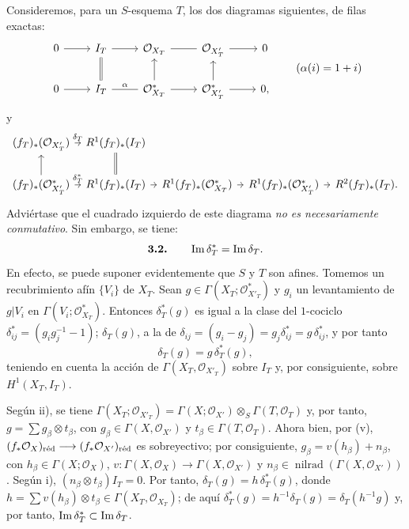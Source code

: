 Consideremos, para un $S$-esquema $T$, los dos diagramas siguientes, de
filas exactas:
\[
\begin{tikzcd}
0 \arrow[r] & I_T \arrow[r] & \mathcal O_{X_T} \arrow[r,dash] &
\mathcal O_{X'_T} \arrow[r] & 0\\
0 \arrow[r] & I_T \arrow[r,"\alpha",dash] \arrow[u,equal] &
\mathcal O_{X_T}^{*} \arrow[r] \arrow[u] &
\mathcal O_{X'_T}^{*} \arrow[r] \arrow[u] & 0 ,
\end{tikzcd}
\qquad (\alpha(i)=1+i)
\]
y
\[
\begin{tikzcd}[column sep=tiny]
(f_T)_*(\mathcal O_{X'_T}) \arrow[r,"\delta_T"] &
R^1(f_T)_*(I_T) \arrow[d,equal]\\
(f_T)_*(\mathcal O_{X'_T}^{*}) \arrow[r,"\delta_T^*"] \arrow[u] &
R^1(f_T)_*(I_T) \arrow[r] &
R^1(f_T)_*(\mathcal O_{X_T}^{*}) \arrow[r] &
\sisi{R'(f_T)_*}{R^1(f_T)_*}(\mathcal O_{X'_T}^{*}) \arrow[r] &
R^2(f_T)_*(I_T) .
\end{tikzcd}
\]
Adviértase que el cuadrado izquierdo de este diagrama \emph{no es
necesariamente conmutativo}. Sin embargo, se tiene:
\[
\textbf{3.2.}\qquad \im\delta_T^*=\im\delta_T.
\]
En efecto, se puede suponer evidentemente que $S$ y $T$ son afines. Tomemos
un recubrimiento afín $\{V_i\}$ de $X_T$. Sean
$g\in\Gamma(X_T;\mathcal O_{X'_T}^{*})$ y $g_i$ un levantamiento de
$g|V_i$ en $\Gamma(V_i;\mathcal O_{X_T}^{*})$. Entonces
$\delta_T^*(g)$ es igual a la clase del $1$-cociclo
$\delta_{ij}^*=(g_ig_j^{-1}-1)$; $\delta_T(g)$, a la de
$\delta_{ij}=(g_i-g_j)=g_j\delta_{ij}^*=g\,\delta_{ij}^*$, y por tanto
\[
\delta_T(g)=g\,\delta_T^*(g),
\]
teniendo en cuenta la acción de
$\Gamma(X_T,\mathcal O_{X'_T})$ sobre $I_T$ y, por consiguiente, sobre
$H^1(X_T,I_T)$.

Según ii), se tiene
$\Gamma(X_T;\mathcal O_{X'_T})=
\Gamma(X;\mathcal O_{X'})\otimes_S\Gamma(T,\mathcal O_T)$ y, por tanto,
$g=\sum g_\beta\otimes t_\beta$, con
$g_\beta\in\Gamma(X,\mathcal O_{X'})$ y
$t_\beta\in\Gamma(T,\mathcal O_T)$. Ahora bien, por (v),
$(f_*\mathcal O_X)_{\red}\longrightarrow
(f_*\mathcal O_{X'})_{\red}$ es sobreyectivo; por consiguiente,
$g_\beta=v(h_\beta)+n_\beta$, con
$h_\beta\in\Gamma(X;\mathcal O_X)$,
$v:\Gamma(X,\mathcal O_X)\to\Gamma(X,\mathcal O_{X'})$ y
$n_\beta\in\operatorname{nilrad}(\Gamma(X,\mathcal O_{X'}))$. Según i),
$(n_\beta\otimes t_\beta)I_T=0$. Por tanto,
$\delta_T(g)=h\,\delta_T^*(g)$, donde
$h=\sum v(h_\beta)\otimes t_\beta\in
\Gamma(X_T,\mathcal O_{X_T})$; de aquí
$\delta_T^*(g)=h^{-1}\delta_T(g)=\delta_T(h^{-1}g)$ y, por tanto,
$\im\delta_T^*\subset\im\delta_T$.

